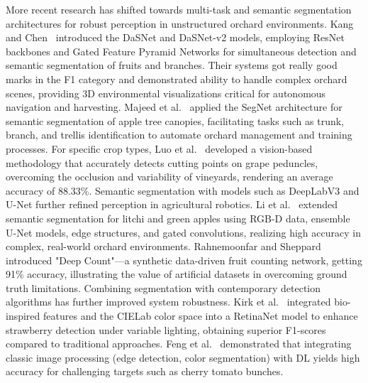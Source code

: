 \documentclass[pdflatex,sn-mathphys-num]{sn-jnl}
\begin{document}
More recent research has shifted towards multi-task and semantic segmentation architectures for robust perception in unstructured orchard environments. Kang and Chen~\cite{kang2019fruit, kang2020fruit} introduced the DaSNet and DaSNet-v2 models, employing ResNet backbones and Gated Feature Pyramid Networks for simultaneous detection and semantic segmentation of fruits and branches. Their systems got really good marks in the F1 category and demonstrated ability to handle complex orchard scenes, providing 3D environmental visualizations critical for autonomous navigation and harvesting. Majeed et al.~\cite{majeed2020deep} applied the SegNet architecture for semantic segmentation of apple tree canopies, facilitating tasks such as trunk, branch, and trellis identification to automate orchard management and training processes.
For specific crop types, 
Luo et al.~\cite{luo2018vision} developed a vision-based methodology that accurately detects cutting points on grape peduncles, overcoming the occlusion and variability of vineyards, rendering an average accuracy of 88.33\%.
Semantic segmentation with models such as DeepLabV3 and U-Net further refined perception in agricultural robotics. 
Li et al.~\cite{li2020detection, li2021novel} extended semantic segmentation for litchi and green apples using RGB-D data, ensemble U-Net models, edge structures, and gated convolutions, realizing high accuracy in complex, real-world orchard environments.
Rahnemoonfar and Sheppard~\cite{rahnemoonfar2017deep} introduced "Deep Count"—a synthetic data-driven fruit counting network, getting 91\% accuracy, illustrating the value of artificial datasets in overcoming ground truth limitations.
Combining segmentation with contemporary detection algorithms has further improved system robustness. 
Kirk et al.~\cite{kirk2020b} integrated bio-inspired features and the CIELab color space into a RetinaNet model to enhance strawberry detection under variable lighting, obtaining superior F1-scores compared to traditional approaches. 
Feng et al.~\cite{feng2018} demonstrated that integrating classic image processing (edge detection, color segmentation) with DL yields high accuracy for challenging targets such as cherry tomato bunches.
\end{document}
